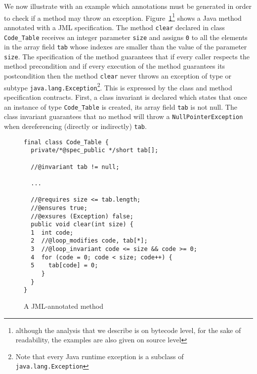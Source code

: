We now illustrate with an example which annotations must be generated in order to check if a method may throw an exception. Figure~\ref{fig:jmlexample}\footnote{although the analysis that we describe is on bytecode level, for the sake of readability, the examples are also given on source level} shows a Java method annotated with a JML specification. The method \verb!clear! declared in class \verb!Code_Table! receives an integer parameter \verb!size! and assigns \verb!0! to all the elements in the array field \verb!tab! whose indexes are smaller than the value of the parameter \verb!size!. The specification of the method guarantees that if every caller respects the method precondition and if every execution of the method guarantees its postcondition then the method \verb!clear! never throws an exception of type or subtype \verb!java.lang.Exception!\footnote{Note that every Java runtime exception is a subclass of \texttt{java.lang.Exception}}. This is expressed by the class and method specification contracts.
First, a class invariant is declared which states that once an instance of type \verb!Code_Table! is created, its array field \verb!tab! is not null. The class invariant guarantees that no method will throw a \verb!NullPointerException! when dereferencing (directly or indirectly) \verb!tab!.

\begin{figure}
\begin{verbatim}
final class Code_Table {
  private/*@spec_public */short tab[];

  //@invariant tab != null;

  ...

  //@requires size <= tab.length;
  //@ensures true;
  //@exsures (Exception) false;
  public void clear(int size) {
  1  int code;
  2  //@loop_modifies code, tab[*];
  3  //@loop_invariant code <= size && code >= 0;
  4  for (code = 0; code < size; code++) {
  5    tab[code] = 0;
     }
  }
}
\end{verbatim}

\caption{A JML-annotated method}
\label{fig:jmlexample}
\end{figure}

